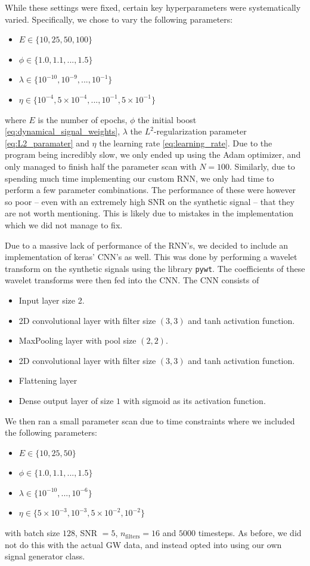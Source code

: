 \documentclass[%
reprint,
amsmath,amssymb,
aps,
]{revtex4-2}
\begin{document}
While these settings were fixed, certain key hyperparameters were systematically varied. Specifically, we chose to vary the following parameters:
\begin{itemize}
	\item $E\in\{10,25,50,100\}$
	\item $\phi\in\{1.0,1.1,...,1.5\}$
	\item $\lambda\in\{10^{-10},10^{-9},...,10^{-1}\}$
	\item $\eta\in\{10^{-4},5\times10^{-4},...,10^{-1},5\times10^{-1}\}$
\end{itemize}
where $E$ is the number of epochs, \(\phi\) the initial boost \eqref{eq:dynamical_signal_weights}, \(\lambda\) the \(L^2\)-regularization parameter \eqref{eq:L2_paramater} and \(\eta\) the learning rate \eqref{eq:learning_rate}. Due to the program being incredibly slow, we only ended up using the Adam optimizer, and only managed to finish half the parameter scan with $N=100$. Similarly, due to spending much time implementing our custom RNN, we only had time to perform a few parameter combinations. The performance of these were however so poor -- even with an extremely high SNR on the synthetic signal -- that they are not worth mentioning. This is likely due to mistakes in the implementation which we did not manage to fix.

Due to a massive lack of performance of the RNN's, we decided to include an implementation of keras' CNN's as well. This was done by performing a wavelet transform on the synthetic signals using the library \texttt{pywt}. The coefficients of these wavelet transforms were then fed into the CNN. The CNN consists of 
\begin{itemize}
	\item Input layer size 2.
	\item 2D convolutional layer with filter size $(3,3)$ and tanh activation function.
	\item MaxPooling layer with pool size $(2,2)$.
	\item 2D convolutional layer with filter size $(3,3)$ and tanh activation function.
	\item Flattening layer
	\item Dense output layer of size $1$ with sigmoid as its activation function.
\end{itemize}
We then ran a small parameter scan due to time constraints where we included the following parameters:
\begin{itemize}
	\item $E\in\{10,25,50\}$
	\item $\phi\in\{1.0,1.1,...,1.5\}$
	\item $\lambda\in\{10^{-10},...,10^{-6}\}$
	\item $\eta\in\{5\times10^{-3},10^{-3},5\times10^{-2},10^{-2}\}$
\end{itemize}
with batch size $128$, SNR $=5$, $n_\text{filters}=16$ and $5000$ timesteps. As before, we did not do this with the actual GW data, and instead opted into using our own signal generator class.
\end{document}

